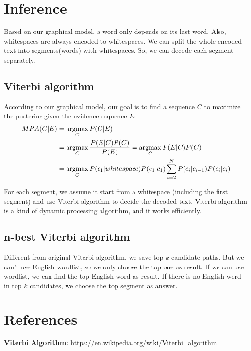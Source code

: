 \documentclass[12pt]{article}%
\newcommand{\argmax}{\operatornamewithlimits{argmax}}
\begin{document}
\section{Inference}
Based on our graphical model, a word only depends on its last word. Also, whitespaces are always encoded to whitespaces. We can split the whole encoded text into segments(words) with whitespaces. So, we can decode each segment separately.
\subsection{Viterbi algorithm}

According to our graphical model, our goal is to find a sequence $C$ to maximize the  posterior given the evidence sequence $E$:\\

\begin{align*}
MPA(C|E) &= \argmax\limits_{C}P(C|E)\\
&= \argmax\limits_{C}\frac { P(E|C)P(C) }{ P(E) } = \argmax\limits_{C} P(E|C)P(C)\\
&= \argmax\limits_{C}P(c_1|whitespace)P(e_1|c_1)\sum_{ i=2 }^{N}{ P(c_i|c_{i-1})P(e_i|c_i) } 
\end{align*}

For each segment, we assume it start from a whitespace (including the first segment) and use Viterbi algorithm to decide the decoded text. Viterbi algorithm is a kind of dynamic processing algorithm, and it works efficiently.\\

\subsection{n-best Viterbi algorithm}
Different from original Viterbi algorithm, we save top $k$ candidate paths. But we can't use English wordlist, so we only choose the top one as result. If we can use wordlist, we can find the top English word as result. If there is no English word in top $k$ candidates, we choose the top segment as answer.


\section{References}

\textbf{Viterbi Algorithm:} \url{https://en.wikipedia.org/wiki/Viterbi_algorithm} \\
\end{document}
